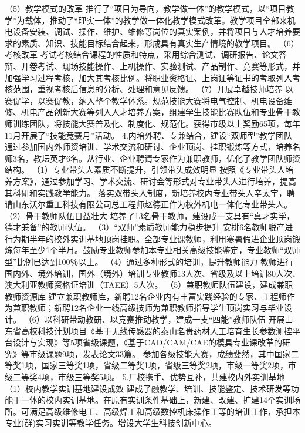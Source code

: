 （5）教学模式的改革
推行了“项目为导向，教学做一体”的教学模式，以“项目教学”为载体，推动了“理实一体”的教学做一体化教学模式改革。教学项目全部来机电设备安装、调试、操作、维护、维修等岗位的真实案例，并将项目与人才培养要求的素质、知识、技能目标结合起来，形成具有真实生产情境的教学项目。
（6）考核改革
考试考核结合课程的性质和特点，采用综合测试、调研报告、论文答辩、开卷考试、现场技能操作、上机操作、实验测试、产品制作、竞赛等形式，并加强学习过程考核，加大其考核比例。将职业资格证、上岗证等证书的考取列入考核范围，重视考核后信息的分析、处理和意见反馈。
（7）开展卓越技师培养
以赛促学，以赛促教，纳入整个教学体系。规范技能大赛将电气控制、机电设备维修、机电产品创新大赛等列入人才培养方案，组建学生技能比赛队伍和专业骨干教师训练团队，将技能大赛普及化、制度化、规范化。获得市级以上奖励65项，每年11月开展了“技能竞赛月”活动。
4.内培外聘、专兼结合，建设“双师型”教学团队
通过参加国内外师资培训、学术交流和研讨、企业顶岗、挂职锻炼等方式，培养名师3名，教坛英才6名。从行业、企业聘请专家作为兼职教师，优化了教学团队师资结构。
（1）专业带头人素质不断提升，引领带头成效明显
按照《专业带头人培养方案》，通过参加学习、学术交流、研讨会等形式对专业带头人进行培养，提高其科研和实践教学能力。
落实双带头人制度，新培养校内专业带头人辛太宇，聘请山东沃尔重工科技有限公司总工程师赵德正作为校外机电一体化专业带头人。
（2）骨干教师队伍日益壮大
培养了13名骨干教师，建设成一支具有“真才实学，德才兼备”的教师队伍。
（3）“双师”素质教师能力稳步提升
安排6名教师脱产进行为期半年的校外实训基地顶岗挂职。全部专业课教师，利用寒暑假进企业顶岗锻炼每年至少1个半月。鼓励专业教师参加本专业相关高级技能鉴定，专业教师“双师型”比例已达到100％以上。
（4）通过多种形式的培训，提升教师能力
教师进行国内外、境外培训，国外（境外）培训专业教师13人次、省级及以上培训80人次、澳大利亚教师资格证培训（TAEE）5人次。
（5）兼职教师队伍建设，建成兼职教师资源库
建立兼职教师库，新聘12名企业内有丰富实践经验的专家、工程师作为兼职教师；新聘12名企业一线高级技师为兼职教师指导学生顶岗实习与毕业设计。
（6）以科研带动教研、以竞赛推动教学，建成一支“四能”教师队伍 
开展山东省高校科技计划项目《基于无线传感器的泰山名贵药材人工培育生长参数测控平台设计与实现》等5项省级课题，《基于CAD/CAM/CAE的模具专业课改革的研究》等市级课题9项，发表论文33篇。
参加各级技能大赛，成绩斐然，其中国家二等奖1项，国家三等奖1项，省级二等奖1项，省级三等奖2项，市级一等奖2项，市级二等奖4项，市级三等奖5项。
5.厂校携手、优势互补，共建校内外实训基地
（1）校内教学实训基地建设成效
建成了融教学、培训、技能鉴定、技术研发等功能于一体的校内实训基地。在原有实训条件基础上，新建、改建、扩建14个实训场所。可满足高级维修电工、高级焊工和高级数控机床操作工等的培训工作，承担本专业(群)实习实训等教学任务。增设大学生科技创新中心。
